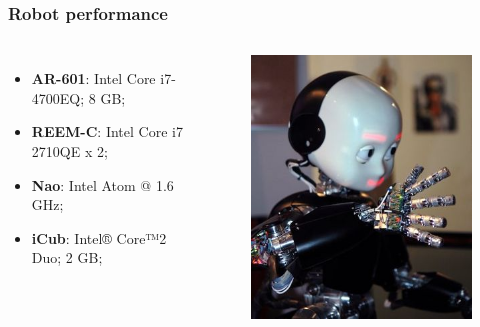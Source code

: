 \documentclass[12pt, aspectratio=169]{beamer}
\begin{document}
\begin{frame}
\frametitle{Robot performance}
\begin{columns}[c] %

\begin{itemize}
\item \textbf{AR-601}: Intel Core i7-4700EQ; 8 GB;
\item \textbf{REEM-C}: Intel Core i7 2710QE x 2;
\item \textbf{Nao}: Intel Atom @ 1.6 GHz;
\item \textbf{iCub}: Intel® Core™2 Duo; 2 GB;
\end{itemize}


\begin{figure}
\includegraphics[width=0.7\linewidth]{330px-ICub_sciencefestival_1}
\end{figure}
\end{columns}
\end{frame}
\end{document}
